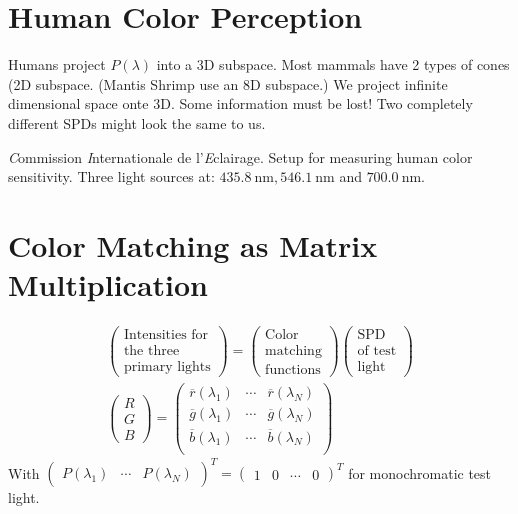 \begin{compactdesc}
		\section{Human Color Perception}
		Humans project $P(\lambda)$ into a 3D subspace. Most mammals have 2 types of cones (2D subspace. (Mantis Shrimp use an 8D subspace.) We project infinite dimensional space onte 3D. Some information must be lost! Two completely different SPDs might look the same to us.
	\item[\lp{The CIE Primary System (1931)}] \emph{C}ommission \emph{I}nternationale de l'\emph{E}clairage. Setup for measuring human color sensitivity. Three light sources at: $\SI{435.8}{\nano\meter},\SI{546.1}{\nano\meter}$ and $\SI{700.0}{\nano\meter}$.
\section{Color Matching as Matrix Multiplication}
\begin{gather*}
	\!\left(\!\begin{smallmatrix}
		\text{Intensities for}\\
		\text{the three}\\
		\text{primary lights}
	\end{smallmatrix}\!\right)\!
	=
	\!\left(\!\begin{smallmatrix}
		\text{Color}\\
		\text{matching}\\
		\text{functions}
	\end{smallmatrix}\!\right)\!
	\!\left(\!\!\begin{smallmatrix}
		\text{SPD}\\
		\text{of test}\\
		\text{light}
	\end{smallmatrix}\!\!\right)\!\\
	\!\left(\!\begin{smallmatrix}
		R\\
		G\\
		B
	\end{smallmatrix}\!\right)\!
	=
	\!\left(\!\begin{smallmatrix}
		\overline{r}(\lambda_1)&\cdots&\overline{r}(\lambda_N)\\
		\overline{g}(\lambda_1)&\cdots&\overline{g}(\lambda_N)\\
		\overline{b}(\lambda_1)&\cdots&\overline{b}(\lambda_N)\\
	\end{smallmatrix}\!\right)\!
\end{gather*}
With $ { \!\left(\!\begin{smallmatrix} P(\lambda_1)&\cdots&P(\lambda_N) \end{smallmatrix}\!\right)\!}^T={\!\left(\!\begin{smallmatrix} 1&0&\cdots&0 \end{smallmatrix}\!\right)\!}^T$ for monochromatic test light.
\end{compactdesc}
